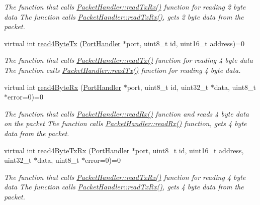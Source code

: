 \begin{DoxyCompactItemize}
\begin{DoxyCompactList}\small\item\em The function that calls \hyperlink{classmercury_1_1_packet_handler_ac743a57bba9e71aadb1578f0e704f166}{Packet\+Handler\+::read\+Tx\+Rx()} function for reading 2 byte data  The function calls \hyperlink{classmercury_1_1_packet_handler_ac743a57bba9e71aadb1578f0e704f166}{Packet\+Handler\+::read\+Tx\+Rx()},  gets 2 byte data from the packet. \end{DoxyCompactList}\item 
virtual int \hyperlink{classmercury_1_1_packet_handler_a636053184fc047cbf93dd3865b8790f4}{read4\+Byte\+Tx} (\hyperlink{classmercury_1_1_port_handler}{Port\+Handler} $\ast$port, uint8\+\_\+t id, uint16\+\_\+t address)=0
\begin{DoxyCompactList}\small\item\em The function that calls \hyperlink{classmercury_1_1_packet_handler_a58220a79dcdff959241bd5688e6dbb1a}{Packet\+Handler\+::read\+Tx()} function for reading 4 byte data  The function calls \hyperlink{classmercury_1_1_packet_handler_a58220a79dcdff959241bd5688e6dbb1a}{Packet\+Handler\+::read\+Tx()} function for reading 4 byte data. \end{DoxyCompactList}\item 
virtual int \hyperlink{classmercury_1_1_packet_handler_a0f590b9cefb32d8b6b00f9ba4f3f37a7}{read4\+Byte\+Rx} (\hyperlink{classmercury_1_1_port_handler}{Port\+Handler} $\ast$port, uint8\+\_\+t id, uint32\+\_\+t $\ast$data, uint8\+\_\+t $\ast$error=0)=0
\begin{DoxyCompactList}\small\item\em The function that calls \hyperlink{classmercury_1_1_packet_handler_a0857bd487c48ea83fc2b93e1e3e80200}{Packet\+Handler\+::read\+Rx()} function and reads 4 byte data on the packet  The function calls \hyperlink{classmercury_1_1_packet_handler_a0857bd487c48ea83fc2b93e1e3e80200}{Packet\+Handler\+::read\+Rx()} function,  gets 4 byte data from the packet. \end{DoxyCompactList}\item 
virtual int \hyperlink{classmercury_1_1_packet_handler_a92d8e5c9d5a0ed26dc5ba3cd78c3b636}{read4\+Byte\+Tx\+Rx} (\hyperlink{classmercury_1_1_port_handler}{Port\+Handler} $\ast$port, uint8\+\_\+t id, uint16\+\_\+t address, uint32\+\_\+t $\ast$data, uint8\+\_\+t $\ast$error=0)=0
\begin{DoxyCompactList}\small\item\em The function that calls \hyperlink{classmercury_1_1_packet_handler_ac743a57bba9e71aadb1578f0e704f166}{Packet\+Handler\+::read\+Tx\+Rx()} function for reading 4 byte data  The function calls \hyperlink{classmercury_1_1_packet_handler_ac743a57bba9e71aadb1578f0e704f166}{Packet\+Handler\+::read\+Tx\+Rx()},  gets 4 byte data from the packet. \end{DoxyCompactList}\item 

\end{DoxyCompactItemize}
